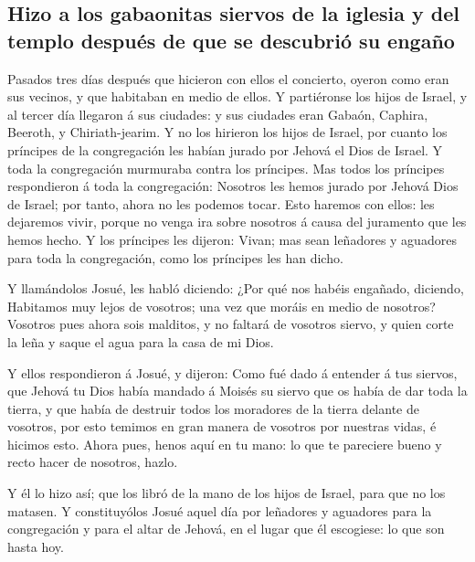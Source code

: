 \hypertarget{hizo-a-los-gabaonitas-siervos-de-la-iglesia-y-del-templo-despuuxe9s-de-que-se-descubriuxf3-su-engauxf1o}{%
\subsection{Hizo a los gabaonitas siervos de la iglesia y del templo
después de que se descubrió su
engaño}\label{hizo-a-los-gabaonitas-siervos-de-la-iglesia-y-del-templo-despuuxe9s-de-que-se-descubriuxf3-su-engauxf1o}}

 Pasados tres días después que hicieron con ellos el
concierto, oyeron como eran sus vecinos, y que habitaban en medio de
ellos.  Y partiéronse los hijos de Israel, y al tercer día
llegaron á sus ciudades: y sus ciudades eran Gabaón, Caphira, Beeroth, y
Chiriath-jearim.  Y no los hirieron los hijos de Israel,
por cuanto los príncipes de la congregación les habían jurado por Jehová
el Dios de Israel. Y toda la congregación murmuraba contra los
príncipes.  Mas todos los príncipes respondieron á toda la
congregación: Nosotros les hemos jurado por Jehová Dios de Israel; por
tanto, ahora no les podemos tocar.  Esto haremos con ellos:
les dejaremos vivir, porque no venga ira sobre nosotros á causa del
juramento que les hemos hecho.  Y los príncipes les
dijeron: Vivan; mas sean leñadores y aguadores para toda la
congregación, como los príncipes les han dicho.

 Y llamándolos Josué, les habló diciendo: ¿Por qué nos
habéis engañado, diciendo, Habitamos muy lejos de vosotros; una vez que
moráis en medio de nosotros?  Vosotros pues ahora sois
malditos, y no faltará de vosotros siervo, y quien corte la leña y saque
el agua para la casa de mi Dios.

 Y ellos respondieron á Josué, y dijeron: Como fué dado á
entender á tus siervos, que Jehová tu Dios había mandado á Moisés su
siervo que os había de dar toda la tierra, y que había de destruir todos
los moradores de la tierra delante de vosotros, por esto temimos en gran
manera de vosotros por nuestras vidas, é hicimos esto. 
Ahora pues, henos aquí en tu mano: lo que te pareciere bueno y recto
hacer de nosotros, hazlo.

 Y él lo hizo así; que los libró de la mano de los hijos de
Israel, para que no los matasen.  Y constituyólos Josué
aquel día por leñadores y aguadores para la congregación y para el altar
de Jehová, en el lugar que él escogiese: lo que son hasta hoy.


